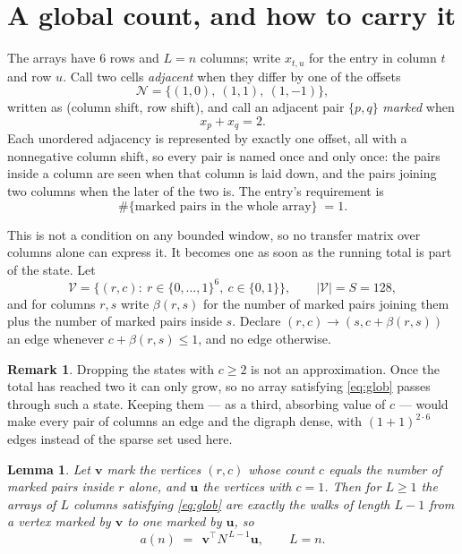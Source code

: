\documentclass[11pt,a4paper]{article}
\theoremstyle{plain}
\newtheorem{lemma}[theorem]{Lemma}
\theoremstyle{definition}
\newtheorem{remark}[theorem]{Remark}
\begin{document}
\section{A global count, and how to carry it}

The arrays have $6$ rows and $L=n$ columns; write $x_{t,u}$ for the entry in
column $t$ and row $u$. Call two cells \emph{adjacent} when they differ by one of the
offsets
\[
\mathcal N=\{(1,0),\ (1,1),\ (1,-1)\},
\]
written as (column shift, row shift), and call an adjacent pair $\{p,q\}$
\emph{marked} when
\[
x_{p}+x_{q}=2 .
\]
Each unordered adjacency is represented by exactly one offset, all with a nonnegative column
shift, so every pair is named once and only once: the pairs inside a column are seen when
that column is laid down, and the pairs joining two columns when the later of the two is. The
entry's requirement is
\begin{equation}\label{eq:glob}
\#\{\text{marked pairs in the whole array}\}\;=1.
\end{equation}

This is not a condition on any bounded window, so no transfer matrix over columns alone can
express it. It becomes one as soon as the running total is part of the state. Let
\[
\mathcal V=\bigl\{(r,c):\ r\in\{0,\dots,1\}^{6},\ c\in\{0,1\}\bigr\},
\qquad |\mathcal V|=S=128,
\]
and for columns $r,s$ write $\beta(r,s)$ for the number of marked pairs joining them plus the
number of marked pairs inside $s$. Declare $(r,c)\to(s,c+\beta(r,s))$ an edge whenever
$c+\beta(r,s)\le1$, and no edge otherwise.

\begin{remark}
Dropping the states with $c\ge2$ is not an approximation. Once the total has reached two it
can only grow, so no array satisfying \eqref{eq:glob} passes through such a state. Keeping
them --- as a third, absorbing value of $c$ --- would make every pair of columns an edge and
the digraph dense, with $(1+1)^{2\cdot6}$ edges instead of the sparse set used here.
\end{remark}

\begin{lemma}\label{lem:walk}
Let $\mathbf{v}$ mark the vertices $(r,c)$ whose count $c$ equals the number of marked pairs
inside $r$ alone, and $\mathbf{u}$ the vertices with $c=1$. Then for $L\ge1$ the arrays
of $L$ columns satisfying \eqref{eq:glob} are exactly the walks of length $L-1$ from a
vertex marked by $\mathbf{v}$ to one marked by $\mathbf{u}$, so
\[
a(n)\;=\;\,\mathbf{v}^{\!\top}N^{\,L-1}\mathbf{u},\qquad L=n .
\]
\end{lemma}
\end{document}
